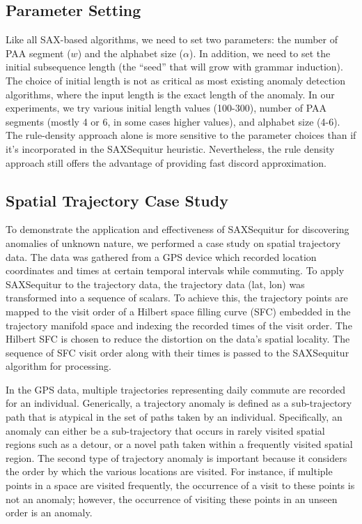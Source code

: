 \documentclass{llncs}
\begin{document}
\subsection{Parameter Setting}
Like all SAX-based algorithms, we need to set two parameters: the number of PAA segment ($w$) and the alphabet size ($\alpha$). In addition, we need to set the initial subsequence length (the ``seed'' that will grow with grammar induction). The choice of initial length is not as critical as most existing anomaly detection algorithms, where the input length is the exact length of the anomaly. In our experiments, we try various initial length values (100-300), number of PAA segments (mostly 4 or 6, in some cases higher values), and alphabet size (4-6). The rule-density approach alone is more sensitive to the parameter choices than if it's incorporated in the SAXSequitur heuristic. Nevertheless, the rule density approach still offers the advantage of providing fast discord approximation. 

\subsection{Spatial Trajectory Case Study}
To demonstrate the application and effectiveness of SAXSequitur for discovering anomalies of unknown nature, we performed a case study on spatial trajectory data. The data was gathered from a GPS device which recorded location coordinates and times at certain temporal intervals while commuting. To apply SAXSequitur to the trajectory data, the trajectory data (lat, lon) was transformed into a sequence of scalars. To achieve this, the trajectory points are mapped to the visit order of a Hilbert space filling curve (SFC) embedded in the trajectory manifold space and indexing the recorded times of the visit order. The Hilbert SFC is chosen to reduce the distortion on the data's spatial locality. The sequence of SFC visit order along with their times is passed to the SAXSequitur algorithm for processing. 

In the GPS data, multiple trajectories representing daily commute are recorded for an individual. Generically, a trajectory anomaly is defined as a sub-trajectory path that is atypical in the set of paths taken by an individual. Specifically, an anomaly can either be a sub-trajectory that occurs in rarely visited spatial regions such as a detour, or a novel path taken within a frequently visited spatial region. The second type of trajectory anomaly is important because it considers the order by which the various locations are visited. For instance, if multiple points in a space are visited frequently, the occurrence of a visit to these points is not an anomaly; however, the occurrence of visiting these points in an unseen order is an anomaly. 
\end{document}

